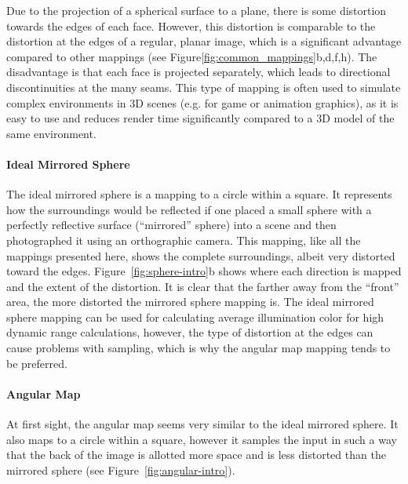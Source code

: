 Due to the projection of a spherical surface to a plane, there is some distortion towards the edges of each face. However, this distortion is comparable to the distortion at the edges of a regular, planar image, which is a significant advantage compared to other mappings (see Figure\ref{fig:common_mappings}b,d,f,h\footnotemark). The disadvantage is that each face is projected separately, which leads to directional discontinuities at the many seams. This type of mapping is often used to simulate complex environments in 3D scenes (e.g. for game or animation graphics), as it is easy to use and reduces render time significantly compared to a 3D model of the same environment.

\cite[p. 540]{hdrbook}

\paragraph{Ideal Mirrored Sphere}
The ideal mirrored sphere is a mapping to a circle within a square. It represents how the surroundings would be reflected if one placed a small sphere with a perfectly reflective surface (``mirrored'' sphere) into a scene and then photographed it using an orthographic camera. This mapping, like all the mappings presented here, shows the complete surroundings, albeit very distorted toward the edges. Figure~\ref{fig:sphere-intro}b shows where each direction is mapped and the extent of the distortion. It is clear that the farther away from the ``front'' area, the more distorted the mirrored sphere mapping is. The ideal mirrored sphere mapping can be used for calculating average illumination color for high dynamic range calculations, however, the type of distortion at the edges can cause problems with sampling, which is why the angular map mapping tends to be preferred.
\cite[p. 535]{hdrbook}

\paragraph{Angular Map}
At first sight, the angular map seems very similar to the ideal mirrored sphere. It also maps to a circle within a square, however it samples the input in such a way that the back of the image is allotted more space and is less distorted than the mirrored sphere (see Figure~\ref{fig:angular-intro}).
\cite[p. 537]{hdrbook}

